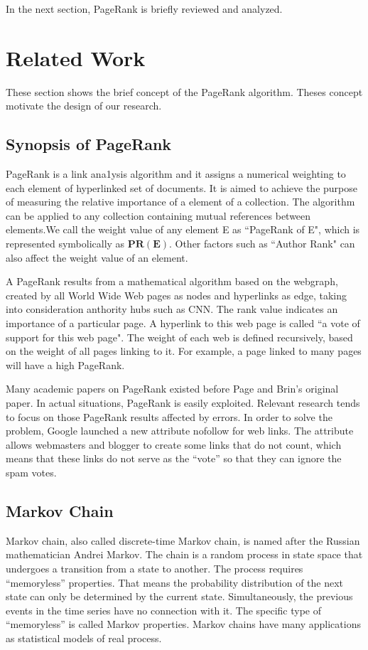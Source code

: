 \documentclass[lettersize,journal,12pt]{IEEEtran}
\begin{document}
In the next section, PageRank is briefly reviewed and analyzed.

\section{Related Work}

These section shows the brief concept of the PageRank algorithm. Theses concept motivate the design of our research.

\subsection{Synopsis of PageRank}

PageRank is a link ana1ysis algorithm and it assigns a numerical weighting to each element of hyperlinked set of documents. It is aimed to achieve the purpose of measuring the relative importance of a element of a collection. The algorithm can be applied to any collection containing mutual references between elements.We call the weight value of any element E as ``PageRank of E", which is represented symbolically as $\boldsymbol{PR(E)}$. Other factors such as ``Author Rank" can also affect the weight value of an element.

A PageRank results from a mathematical algorithm based on the webgraph, created by all World Wide Web pages as nodes and hyperlinks as edge, taking into consideration anthority hubs such as CNN. The rank value indicates an importance of a particular page. A hyperlink to this web page is called ``a vote of support for this web page". The weight of each web is defined recursively, based on the weight of all pages linking to it. For example, a page linked to many pages will have a high PageRank.

Many academic papers on PageRank existed before Page and Brin's original paper. In actual situations, PageRank is easily exploited. Relevant research tends to focus on those PageRank results affected by errors. In order to solve the problem, Google launched a new attribute nofollow for web links. The attribute allows webmasters and blogger to create some links that do not count, which means that these links do not serve as the ``vote'' so that they can ignore the spam votes.

\subsection{Markov Chain}

Markov chain, also called discrete-time Markov chain, is named after the Russian mathematician Andrei Markov. The chain is a random process in state space that undergoes a transition from a state to another. The process requires ``memoryless'' properties. That means the probability distribution of the next state can only be determined by the current state. Simultaneously, the previous events in the time series have no connection with it. The specific type of ``memoryless'' is called Markov properties. Markov chains have many applications as statistical models of real process.
\end{document}
